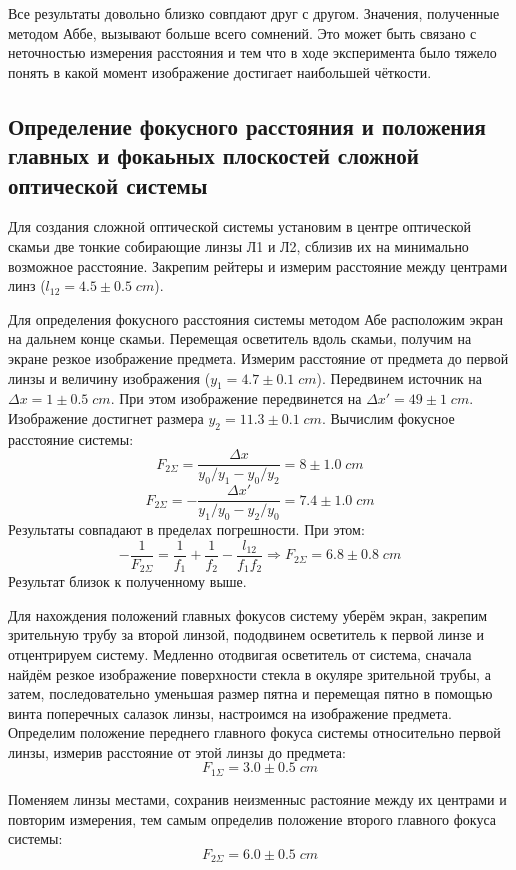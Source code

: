\documentclass{article}
\begin{document}
Все результаты довольно близко совпдают друг с другом. Значения, полученные методом Аббе,
вызывают больше всего сомнений. Это может быть связано с неточностью измерения расстояния и тем
что в ходе эксперимента было тяжело понять в какой момент изображение достигает наибольшей чёткости.

\subsection{Определение фокусного расстояния и положения главных и фокаьных плоскостей сложной оптической системы}
Для создания сложной оптической системы установим в центре оптической скамьи две тонкие собирающие линзы
Л1 и Л2, сблизив их на минимально возможное расстояние. Закрепим рейтеры и измерим расстояние между
центрами линз (\(l_{12} = 4.5 \pm 0.5\; cm\)).

Для определения фокусного расстояния системы методом Абе расположим экран на дальнем конце скамьи.
Перемещая осветитель вдоль скамьи, получим на экране резкое изображение предмета. Измерим расстояние от
предмета до первой линзы и величину изображения (\(y_1 = 4.7\pm 0.1\; cm\)).
Передвинем источник на \(\Delta x = 1 \pm 0.5 \;cm\). При этом изображение передвинется на \(\Delta x' = 49 \pm 1\; cm\).
Изображение достигнет размера \(y_2 = 11.3\pm 0.1\; cm \). Вычислим фокусное расстояние системы:
\[F_{2\Sigma} = \frac{\Delta x}{y_0/y_1 - y_0/y_2} = 8\pm 1.0\; cm \]
\[F_{2\Sigma} = -\frac{\Delta x'}{y_1/y_0 - y_2/y_0} = 7.4 \pm 1.0\; cm\]
Результаты совпадают в пределах погрешности. При этом:
\[ -\frac{1}{F_{2\Sigma}} = \frac{1}{f_1} + \frac{1}{f_2} - \frac{l_{12}}{f_1f_2} \Rightarrow F_{2\Sigma} = 6.8 \pm 0.8\; cm\]
Результат близок к полученному выше.

Для нахождения положений главных фокусов систему уберём экран, закрепим зрительную трубу за второй
линзой, пододвинем осветитель к первой линзе и отцентрируем систему.
Медленно отодвигая осветитель от система, сначала найдём резкое изображение поверхности стекла в
окуляре зрительной трубы, а затем, последовательно уменьшая размер пятна и перемещая пятно в помощью винта
поперечных салазок линзы, настроимся на изображение предмета. Определим положение переднего главного
фокуса системы относительно первой линзы, измерив расстояние от этой линзы до предмета:
\[ F_{1\Sigma} = 3.0 \pm 0.5\; cm \]

Поменяем линзы местами, сохранив неизменныс растояние между их центрами и повторим измерения, тем самым
определив положение второго главного фокуса системы:
\[ F_{2\Sigma} = 6.0 \pm 0.5\; cm \]
\end{document}
